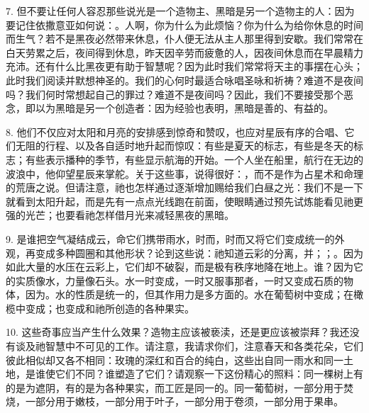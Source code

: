 7. 但不要让任何人容忍那些说光是一个造物主、黑暗是另一个造物主的人：因为要记住依撒意亚如何说：。人啊，你为什么为此烦恼？你为什么为给你休息的时间而生气？若不是黑夜必然带来休息，仆人便无法从主人那里得到安歇。我们常常在白天劳累之后，夜间得到休息，昨天因辛劳而疲惫的人，因夜间休息而在早晨精力充沛。还有什么比黑夜更有助于智慧呢？因为此时我们常常将天主的事摆在心头；此时我们阅读并默想神圣的。我们的心何时最适合咏唱圣咏和祈祷？难道不是夜间吗？我们何时常想起自己的罪过？难道不是夜间吗？因此，我们不要接受那个恶念，即以为黑暗是另一个创造者：因为经验也表明，黑暗是善的、有益的。\par

8. 他们不仅应对太阳和月亮的安排感到惊奇和赞叹，也应对星辰有序的合唱、它们无阻的行程、以及各自适时地升起而惊叹：有些是夏天的标志，有些是冬天的标志；有些表示播种的季节，有些显示航海的开始。一个人坐在船里，航行在无边的波浪中，他仰望星辰来掌舵。关于这些事，说得很好：，而不是作为占星术和命理的荒唐之说。但请注意，祂也怎样通过逐渐增加赐给我们白昼之光：我们不是一下就看到太阳升起，而是先有一点点光线跑在前面，使眼睛通过预先试炼能看见祂更强的光芒；也要看祂怎样借月光来减轻黑夜的黑暗。\par

9. 是谁把空气凝结成云，命它们携带雨水，时而，时而又将它们变成统一的外观，再变成多种圆圈和其他形状？论到这些说：祂知道云彩的分离，并；；。因为如此大量的水压在云彩上，它们却不破裂，而是极有秩序地降在地上。谁？因为它的实质像水，力量像石头。水一时变成，一时又服事那者，一时又变成石质的物体，因为。水的性质是统一的，但其作用力是多方面的。水在葡萄树中变成；在橄榄中变成；也变成和祂所创造的各种果实。\par

10. 这些奇事应当产生什么效果？造物主应该被亵渎，还是更应该被崇拜？我还没有谈及祂智慧中不可见的工作。请注意，我请求你们，注意春天和各类花朵，它们彼此相似却又各不相同：玫瑰的深红和百合的纯白，这些出自同一雨水和同一土地，是谁使它们不同？谁塑造了它们？请观察一下这份精心的照料：同一棵树上有的是为遮阴，有的是为各种果实，而工匠是同一的。同一葡萄树，一部分用于焚烧，一部分用于嫩枝，一部分用于叶子，一部分用于卷须，一部分用于果串。\par


